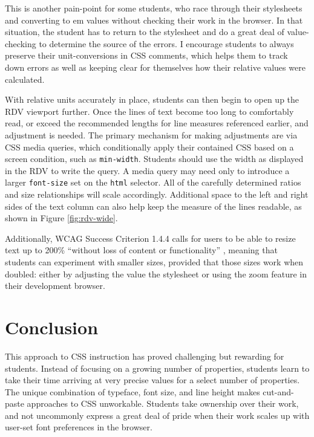 \documentclass[sigplan,screen]{acmart}
\begin{document}
This is another pain-point for some students, who race through their stylesheets and converting to em values without checking their work in the browser. In that situation, the student has to return to the stylesheet and do a great deal of value-checking to determine the source of the errors. I encourage students to always preserve their unit-conversions in CSS comments, which helps them to track down errors as well as keeping clear for themselves how their relative values were calculated.

With relative units accurately in place, students can then begin to open up the RDV viewport further. Once the lines of text become too long to comfortably read, or exceed the recommended lengths for line measures referenced earlier, and adjustment is needed. The primary mechanism for making adjustments are via CSS media queries, which conditionally apply their contained CSS based on a screen condition, such as \verb|min-width|. Students should use the width as displayed in the RDV to write the query. A media query may need only to introduce a larger \verb|font-size| set on the \verb|html| selector. All of the carefully determined ratios and size relationships will scale accordingly. Additional space to the left and right sides of the text column can also help keep the measure of the lines readable, as shown in Figure \ref{fig:rdv-wide}.

 Additionally, WCAG Success Criterion 1.4.4 calls for users to be able to resize text up to 200\% “without loss of content or functionality” \cite{w3c:wcag}, meaning that students can experiment with smaller sizes, provided that those sizes work when doubled: either by adjusting the value the stylesheet or using the zoom feature in their development browser.

\section{Conclusion}

This approach to CSS instruction has proved challenging but rewarding for students. Instead of focusing on a growing number of properties, students learn to take their time arriving at very precise values for a select number of properties. The unique combination of typeface, font size, and line height makes cut-and-paste approaches to CSS unworkable. Students take ownership over their work, and not uncommonly express a great deal of pride when their work scales up with user-set font preferences in the browser. 
\end{document}
